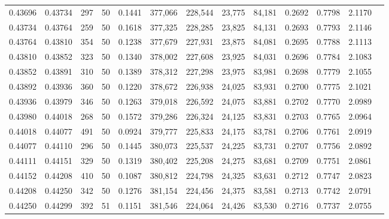 \begin{tabular}{rrrrrrrrrrrrr}
0.43696 & 0.43734 &   297 &  50 &                                     0.1441 & 377,066 & 228,544 &  23,775 &  84,181 & 0.2692 & 0.7798 & 2.1170 \\
0.43734 & 0.43764 &   259 &  50 &                                     0.1618 & 377,325 & 228,285 &  23,825 &  84,131 & 0.2693 & 0.7793 & 2.1146 \\
0.43764 & 0.43810 &   354 &  50 &                                     0.1238 & 377,679 & 227,931 &  23,875 &  84,081 & 0.2695 & 0.7788 & 2.1113 \\
0.43810 & 0.43852 &   323 &  50 &                                     0.1340 & 378,002 & 227,608 &  23,925 &  84,031 & 0.2696 & 0.7784 & 2.1083 \\
0.43852 & 0.43891 &   310 &  50 &                                     0.1389 & 378,312 & 227,298 &  23,975 &  83,981 & 0.2698 & 0.7779 & 2.1055 \\
0.43892 & 0.43936 &   360 &  50 &                                     0.1220 & 378,672 & 226,938 &  24,025 &  83,931 & 0.2700 & 0.7775 & 2.1021 \\
0.43936 & 0.43979 &   346 &  50 &                                     0.1263 & 379,018 & 226,592 &  24,075 &  83,881 & 0.2702 & 0.7770 & 2.0989 \\
0.43980 & 0.44018 &   268 &  50 &                                     0.1572 & 379,286 & 226,324 &  24,125 &  83,831 & 0.2703 & 0.7765 & 2.0964 \\
0.44018 & 0.44077 &   491 &  50 &                                     0.0924 & 379,777 & 225,833 &  24,175 &  83,781 & 0.2706 & 0.7761 & 2.0919 \\
0.44077 & 0.44110 &   296 &  50 &                                     0.1445 & 380,073 & 225,537 &  24,225 &  83,731 & 0.2707 & 0.7756 & 2.0892 \\
0.44111 & 0.44151 &   329 &  50 &                                     0.1319 & 380,402 & 225,208 &  24,275 &  83,681 & 0.2709 & 0.7751 & 2.0861 \\
0.44152 & 0.44208 &   410 &  50 &                                     0.1087 & 380,812 & 224,798 &  24,325 &  83,631 & 0.2712 & 0.7747 & 2.0823 \\
0.44208 & 0.44250 &   342 &  50 &                                     0.1276 & 381,154 & 224,456 &  24,375 &  83,581 & 0.2713 & 0.7742 & 2.0791 \\
0.44250 & 0.44299 &   392 &  51 &                                     0.1151 & 381,546 & 224,064 &  24,426 &  83,530 & 0.2716 & 0.7737 & 2.0755 \\

\end{tabular}
